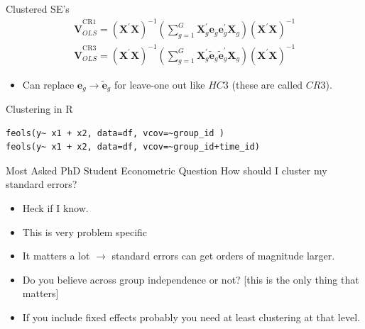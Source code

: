 \documentclass[aspectratio=169,11pt]{beamer}
\begin{document}
\begin{frame}{Clustered SE's}
\begin{align*}
\widehat { \boldsymbol { V } } _ { OLS } ^ { \mathrm { CR } 1 } = \left( \boldsymbol { X } ^ { \prime } \boldsymbol { X } \right) ^ { - 1 } \left( \sum _ { g = 1 } ^ { G } \boldsymbol { X } _ { g } ^ { \prime } \boldsymbol { e }_ { g }  \boldsymbol { e }_ { g } ^ { \prime } \boldsymbol { X } _ { g } \right) \left( \boldsymbol { X } ^ { \prime } \boldsymbol { X } \right) ^ { - 1 }\\
\widehat { \boldsymbol { V } } _ { OLS } ^ { \mathrm { CR } 3 } = \left( \boldsymbol { X } ^ { \prime } \boldsymbol { X } \right) ^ { - 1 } \left( \sum _ { g = 1 } ^ { G } \boldsymbol { X } _ { g } ^ { \prime } \widetilde { \boldsymbol { e } } _ { g }  \widetilde { \boldsymbol { e } } _ { g } ^ { \prime } \boldsymbol { X } _ { g } \right) \left( \boldsymbol { X } ^ { \prime } \boldsymbol { X } \right) ^ { - 1 }
\end{align*}
\begin{itemize}
\item Can replace  $\mathbf{e}_g  \rightarrow \tilde { \mathbf{e}}_g $ for leave-one out like $HC3$ (these are called $CR3$).
\end{itemize}
\end{frame}


\begin{frame}[fragile]{Clustering in R}
\begin{lstlisting}
feols(y~ x1 + x2, data=df, vcov=~group_id )
feols(y~ x1 + x2, data=df, vcov=~group_id+time_id)
\end{lstlisting}
\end{frame}



\begin{frame}{Most Asked PhD Student Econometric Question}
 How should I cluster my standard errors?
\begin{itemize}
\item Heck if I know.
\item This is very problem specific
\item It matters a lot $\rightarrow$ standard errors can get orders of magnitude larger.
\item Do you believe across group independence or not? [this is the only thing that matters]
\item If you include \alert{fixed effects} probably you need at least clustering at that level.
\end{itemize}
\end{frame}
\end{document}
